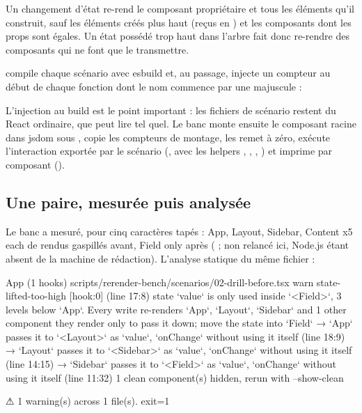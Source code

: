 \begin{react}
Un changement d'état re-rend le composant propriétaire et tous les éléments qu'il construit, sauf les éléments créés plus haut (reçus en ) et les composants  dont les props sont égales. Un état possédé trop haut dans l'arbre fait donc re-rendre des composants qui ne font que le transmettre.
\end{react}

 compile chaque scénario avec esbuild et, au passage, injecte un compteur au début de chaque fonction dont le nom commence par une majuscule :


L'injection au build est le point important : les fichiers de scénario restent du React ordinaire, que \reactant{} peut lire tel quel. Le banc monte ensuite le composant racine dans jsdom sous , copie les compteurs de montage, les remet à zéro, exécute l'interaction exportée par le scénario (, avec les helpers , , , ) et imprime  par composant ().

\subsection{Une paire, mesurée puis analysée}


Le banc a mesuré, pour cinq caractères tapés : \og App, Layout, Sidebar, Content x5 each\fg{} de rendus gaspillés avant, \og Field only\fg{} après ( ; non relancé ici, Node.js étant absent de la machine de rédaction). L'analyse statique du même fichier :

\begin{sortie}
  App  (1 hooks)  scripts/rerender-bench/scenarios/02-drill-before.tsx
    warn   state-lifted-too-high  [hook:0]  (line 17:8)  state `value` is only used inside `<Field>`, 3 levels below `App`. Every write re-renders `App`, `Layout`, `Sidebar` and 1 other component they render only to pass it down; move the state into `Field`
       → `App` passes it to `<Layout>` as `value`, `onChange` without using it itself (line 18:9)
       → `Layout` passes it to `<Sidebar>` as `value`, `onChange` without using it itself (line 14:15)
       → `Sidebar` passes it to `<Field>` as `value`, `onChange` without using it itself (line 11:32)
   1 clean component(s) hidden, rerun with --show-clean

⚠  1 warning(s) across 1 file(s).
exit=1
\end{sortie}

